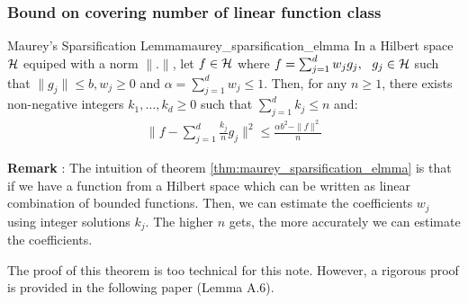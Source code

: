 \subsubsection{Bound on covering number of linear function class}
\begin{theorem}{Maurey's Sparsification Lemma}{maurey_sparsification_elmma}
    In a Hilbert space $\mathcal{H}$ equiped with a norm $\|.\|$, let $f\in\mathcal{H}$ where $f=\sum_{j=1}^d w_jg_j, \ \ g_j\in\mathcal{H}$ such that $\|g_j\| \le b, w_j \ge 0$ and $\alpha=\sum_{j=1}^d w_j \le 1$. Then, for any $n\ge1$, there exists non-negative integers $k_1, \dots, k_d\ge0$ such that $\sum_{j=1}^d k_j \le n$ and:
    \begin{align*}
        \Bigg\|
            f - \sum_{j=1}^d \frac{k_j}{n} g_j 
        \Bigg\|^2
        \le \frac{\alpha b^2 - \|f\|^2}{n}
    \end{align*}
\end{theorem}

\noindent \textbf{Remark} : The intuition of theorem \ref{thm:maurey_sparsification_elmma} is that if we have a function from a Hilbert space which can be written as linear combination of bounded functions. Then, we can estimate the coefficients $w_j$ using integer solutions $k_j$. The higher $n$ gets, the more accurately we can estimate the coefficients.

\begin{proof*}
    The proof of this theorem is too technical for this note. However, a rigorous proof is provided in the following paper \cite{article:bartlett} (Lemma A.6).
\end{proof*}

